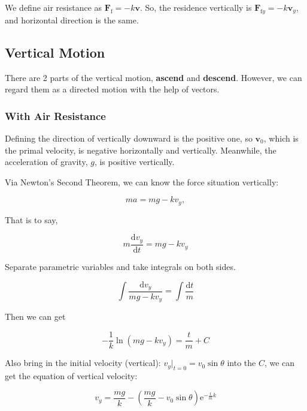 \documentclass{article}
\begin{document}
We define air resistance as $\boldsymbol{F}_\mathrm{f}=-k\boldsymbol{v}$. So, the residence vertically is $\boldsymbol{F}_{\mathrm{f}y}=-k\boldsymbol{v}_y$, and horizontal direction is the same.

\subsection{Vertical Motion}

There are 2 parts of the vertical motion, \textbf{ascend} and \textbf{descend}. However, we can regard them as a directed motion with the help of vectors.

\subsubsection{With Air Resistance}

Defining the direction of vertically downward is the positive one, so $\boldsymbol{v}_0$, which is the primal velocity, is negative horizontally and vertically. Meanwhile, the acceleration of gravity, $g$, is positive vertically.

Via Newton's Second Theorem, we can know the force situation vertically:

\newcommand{\derive}{\mathrm{d}}

\begin{equation*}
    ma = mg - kv_y,
\end{equation*}

That is to say,

\begin{equation}
    m\dfrac{\derive v_y}{\derive t} = mg - kv_y
\end{equation}

Separate parametric variables and take integrals on both sides.

\begin{equation}
    \int\dfrac{\derive v_y}{mg - kv_y} = \int\dfrac{\derive t}{m}
\end{equation}

Then we can get

\begin{equation}
    -\dfrac{1}{k}\ln\left(mg-kv_y\right)=\dfrac{t}{m}+C
\end{equation}

Also bring in the initial velocity (vertical): $v_y\big\vert_{t=0}=v_0\sin\theta$ into the $C$, we can get the equation of vertical velocity:

\begin{equation}
    v_y=\dfrac{mg}{k}-\left(\dfrac{mg}{k}-v_0\sin\theta\right)\mathrm{e}^{-\frac{t}{m}k} \label{eq:vertical-velocity}
\end{equation}
\end{document}
